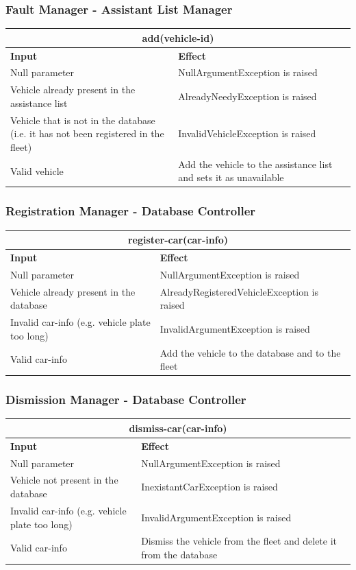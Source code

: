 \documentclass{article}
\begin{document}
\subsubsection{Fault Manager - Assistant List Manager}
\begin{tabular}{ |p{5cm}|p{7cm}| }
  \hline
  \multicolumn{2}{|c|}{add(vehicle-id)} \\
  \hline
  \textbf{Input} & \textbf{Effect} \\
  \hline
  Null parameter & NullArgumentException is raised\\
  \hline
  Vehicle already present in the assistance list & AlreadyNeedyException is raised\\
  \hline
  Vehicle that is not in the database (i.e. it has not been registered in the fleet) & InvalidVehicleException is raised\\
  \hline
  Valid vehicle & Add the vehicle to the assistance list and sets it as unavailable\\
  \hline
\end{tabular}
\subsubsection{Registration Manager - Database Controller }
\begin{tabular}{ |p{5cm}|p{7cm}| }
  \hline
  \multicolumn{2}{|c|}{register-car(car-info)} \\
  \hline
  \textbf{Input} & \textbf{Effect} \\
  \hline
  Null parameter & NullArgumentException is raised\\
  \hline
  Vehicle already present in the database & AlreadyRegisteredVehicleException is raised\\
  \hline
  Invalid car-info (e.g. vehicle plate too long) & InvalidArgumentException is raised\\
  \hline
  Valid car-info & Add the vehicle to the database and to the fleet\\
  \hline
\end{tabular}
\subsubsection{Dismission Manager - Database Controller }
\begin{tabular}{ |p{5cm}|p{7cm}| }
  \hline
  \multicolumn{2}{|c|}{dismiss-car(car-info)} \\
  \hline
  \textbf{Input} & \textbf{Effect} \\
  \hline
  Null parameter & NullArgumentException is raised\\
  \hline
  Vehicle not present in the database & InexistantCarException is raised\\
  \hline
  Invalid car-info (e.g. vehicle plate too long) & InvalidArgumentException is raised\\
  \hline
  Valid car-info & Dismiss the vehicle from the fleet and delete it from the database\\
  \hline
\end{tabular}
\end{document}
